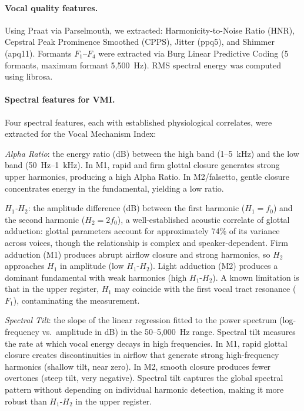 \documentclass[review,3p,number]{elsarticle}
\begin{document}
\paragraph{Vocal quality features.}
Using Praat via Parselmouth,\cite{boersma2023} we extracted: Harmonicity-to-Noise
Ratio (HNR), Cepstral Peak Prominence Smoothed (CPPS),\cite{maryn2015} Jitter
(ppq5), and Shimmer (apq11).\cite{boersma2023} Formants $F_1$--$F_4$ were extracted via
Burg Linear Predictive Coding (5 formants, maximum formant 5,500~Hz). RMS spectral
energy was computed using librosa.

\paragraph{Spectral features for VMI.}
Four spectral features, each with established physiological correlates, were
extracted for the Vocal Mechanism Index:

\emph{Alpha Ratio}\cite{sundberg1987,yousef2024}: the energy ratio (dB) between the high band
(1--5~kHz) and the low band (50~Hz--1~kHz). In M1, rapid and firm glottal closure
generates strong upper harmonics, producing a high Alpha Ratio. In M2/falsetto,
gentle closure concentrates energy in the fundamental, yielding a low ratio.

\emph{$H_1$-$H_2$}\cite{kreiman2012,kreiman2014}: the amplitude difference (dB) between
the first harmonic ($H_1 = f_0$) and the second harmonic ($H_2 = 2f_0$), a well-established
acoustic correlate of glottal adduction: glottal parameters account for approximately
74\% of its variance across voices, though the relationship is complex and
speaker-dependent. Firm adduction (M1) produces
abrupt airflow closure and strong harmonics, so $H_2$ approaches $H_1$ in amplitude (low
$H_1$-$H_2$). Light adduction (M2) produces a dominant fundamental with weak harmonics
(high $H_1$-$H_2$). A known limitation is that in the upper register, $H_1$
may coincide with the first vocal tract resonance ($F_1$), contaminating the
measurement.\cite{kreiman2012}

\emph{Spectral Tilt}\cite{degottex2011,drugman2019}: the slope of the linear regression
fitted to the power spectrum (log-frequency vs.\ amplitude in dB) in the 50--5,000~Hz
range. Spectral tilt measures the rate at which vocal energy decays in high
frequencies. In M1, rapid glottal closure creates discontinuities in airflow that
generate strong high-frequency harmonics (shallow tilt, near zero). In M2, smooth
closure produces fewer overtones (steep tilt, very negative). Spectral tilt captures
the global spectral pattern without depending on individual harmonic detection,
making it more robust than $H_1$-$H_2$ in the upper register.
\end{document}
